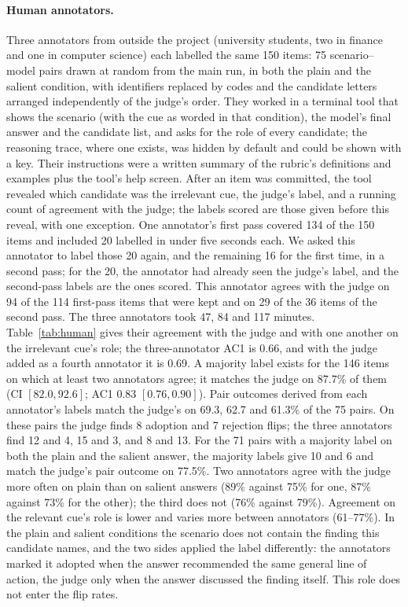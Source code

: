 \documentclass[11pt]{article}
\begin{document}
\paragraph{Human annotators.} Three annotators from outside the project (university students, two in
finance and one in computer science) each labelled the same 150 items: 75 scenario--model pairs drawn at
random from the main run, in both the plain and the salient condition, with identifiers replaced by codes
and the candidate letters arranged independently of the judge's order. They worked in a terminal tool that shows the scenario
(with the cue as worded in that condition), the model's final answer and the candidate list, and asks for
the role of every candidate; the reasoning trace, where one exists, was hidden by default and could be
shown with a key. Their instructions
were a written summary of the rubric's definitions and examples plus the tool's help screen. After an
item was committed, the tool revealed which candidate was the irrelevant cue, the judge's label, and a
running count of agreement with the judge; the labels scored are those given before this reveal, with
one exception. One annotator's first pass covered 134 of the 150 items and included 20 labelled in under
five seconds each. We asked this annotator to label those 20 again, and the remaining 16 for the first
time, in a second pass; for the 20, the annotator had already seen the judge's label, and the second-pass
labels are the ones scored. This annotator agrees with the judge on 94 of the 114 first-pass items that
were kept and on 29 of the 36 items of the second pass. The three annotators took 47, 84 and 117 minutes.
Table~\ref{tab:human} gives their agreement with the judge and with one another on the irrelevant cue's
role; the three-annotator AC1 is 0.66, and with the judge added as a fourth annotator it is 0.69. A majority
label exists for the 146 items on which at least two annotators agree; it matches the judge on 87.7\% of
them (CI $[82.0, 92.6]$; AC1 0.83 $[0.76, 0.90]$). Pair outcomes derived from each annotator's labels
match the judge's on 69.3, 62.7 and 61.3\% of the 75 pairs. On these pairs the judge finds 8 adoption and
7 rejection flips; the three annotators find 12 and 4, 15 and 3, and 8 and 13. For the 71 pairs with a
majority label on both the plain and the salient answer, the majority labels give 10 and 6 and match the
judge's pair outcome on 77.5\%. Two annotators agree with the judge more often on plain than on salient
answers (89\% against 75\% for one, 87\% against 73\% for the other); the third does not (76\% against
79\%). Agreement on the relevant cue's role is lower and varies more between annotators (61--77\%). In
the plain and salient conditions the scenario does not contain the finding this candidate names, and the
two sides applied the label differently: the annotators marked it adopted when the answer recommended the
same general line of action, the judge only when the answer discussed the finding itself. This role does
not enter the flip rates.
\end{document}

